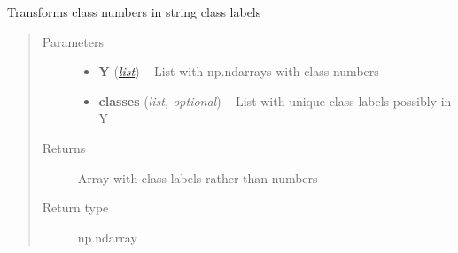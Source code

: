 \documentclass[letterpaper,10pt,english]{sphinxmanual}
\begin{document}

\begin{fulllineitems}
\label{classification:flamingo.classification.utils.int2labels}
Transforms class numbers in string class labels
\begin{quote}\begin{description}
\item[{Parameters}] \leavevmode\begin{itemize}
\item {} 
\textbf{Y} (\href{http://docs.python.org/library/functions.html\#list}{\emph{list}}) -- List with np.ndarrays with class numbers

\item {} 
\textbf{classes} (\emph{list, optional}) -- List with unique class labels possibly in Y

\end{itemize}

\item[{Returns}] \leavevmode
Array with class labels rather than numbers

\item[{Return type}] \leavevmode
np.ndarray

\end{description}\end{quote}

\end{fulllineitems}

\end{document}
